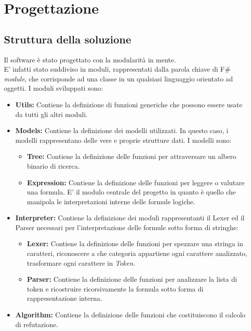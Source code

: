 \documentclass[\main/tesi.tex]{subfiles}
\begin{document}
\chapter{Progettazione}

\section{Struttura della soluzione}
Il software è stato progettato con la modularità in mente. \\
E' infatti stato suddiviso in moduli, rappresentati dalla parola chiave di F\# \cite{fsharp} \textit{module}, che corrisponde ad una classe in un qualsiasi linguaggio orientato ad oggetti.
I moduli sviluppati sono:
\begin{itemize}
    \item \textbf{Utils:} Contiene la definizione di funzioni generiche che possono essere usate da tutti gli altri moduli.
    \item \textbf{Models:} Contiene la definizione dei modelli utilizzati. In questo caso, i modelli rappresentano delle vere e proprie strutture dati. I modelli sono:
          \begin{itemize}
              \item \textbf{Tree:} Contiene la definizione delle funzioni per attraversare un albero binario di ricerca.
              \item \textbf{Expression:} Contiene la definizione delle funzioni per leggere o valutare una formula. E' il modulo centrale del progetto in quanto è quello che manipola le interpretazioni interne delle formule logiche.
          \end{itemize}
    \item \textbf{Interpreter:} Contiene la definizione dei moduli rappresentanti il Lexer ed il Parser necessari per l'interpretazione delle formule sotto forma di stringhe:
          \begin{itemize}
              \item \textbf{Lexer:} Contiene la definizione delle funzioni per spezzare una stringa in caratteri, riconoscere a che categoria appartiene ogni carattere analizzato, trasformare ogni carattere in \textit{Token}.
              \item \textbf{Parser:} Contiene la definizione delle funzioni per analizzare la lista di token e ricostruire ricorsivamente la formula sotto forma di rappresentazione interna.
          \end{itemize}
    \item \textbf{Algorithm:} Contiene la definizione delle funzioni che costituiscono il calcolo di refutazione.
\end{itemize}
\end{document}
